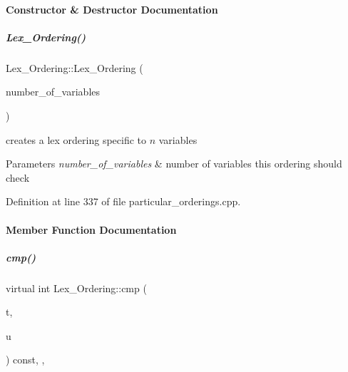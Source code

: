 \paragraph{Constructor \& Destructor Documentation}
\mbox{\label{group__orderinggroup_a35968aecc4009c0d15bfd357ccf74a5f}} 
\subparagraph{\texorpdfstring{Lex\+\_\+\+Ordering()}{Lex\_Ordering()}}
{\footnotesize\ttfamily Lex\+\_\+\+Ordering\+::\+Lex\+\_\+\+Ordering (\begin{DoxyParamCaption}\item[{N\+V\+A\+R\+\_\+\+T\+Y\+PE}]{number\+\_\+of\+\_\+variables }\end{DoxyParamCaption})\hspace{0.3cm}{\ttfamily [explicit]}}



creates a lex ordering specific to $n$ variables 


\begin{DoxyParams}{Parameters}
{\em number\+\_\+of\+\_\+variables} & number of variables this ordering should check \\
\hline
\end{DoxyParams}


Definition at line 337 of file particular\+\_\+orderings.\+cpp.



\paragraph{Member Function Documentation}
\mbox{\label{group__orderinggroup_a44d74f3b1e29abde22334f455979a67f}} 
\subparagraph{\texorpdfstring{cmp()}{cmp()}}
{\footnotesize\ttfamily virtual int Lex\+\_\+\+Ordering\+::cmp (\begin{DoxyParamCaption}\item[{const \hyperlink{group__polygroup_class_monomial}{Monomial} \&}]{t,  }\item[{const \hyperlink{group__polygroup_class_monomial}{Monomial} \&}]{u }\end{DoxyParamCaption}) const\hspace{0.3cm}{\ttfamily [inline]}, {\ttfamily [override]}, {\ttfamily [virtual]}}


